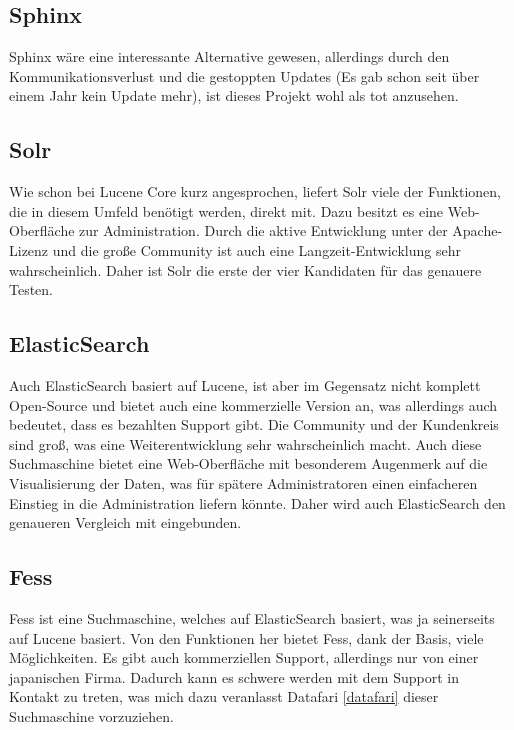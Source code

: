 \subsection{Sphinx}

Sphinx wäre eine interessante Alternative gewesen, allerdings durch den Kommunikationsverlust und die gestoppten Updates (Es gab schon seit über einem Jahr kein Update mehr), ist dieses Projekt wohl als tot anzusehen. \cite{SphinxTechnologiesInc.2019}

\subsection{Solr}

Wie schon bei Lucene Core kurz angesprochen, liefert Solr viele der Funktionen, die in diesem Umfeld benötigt werden, direkt mit. Dazu besitzt es eine Web-Oberfläche zur Administration. Durch die aktive Entwicklung unter der Apache-Lizenz und die große Community ist auch eine Langzeit-Entwicklung sehr wahrscheinlich. Daher ist Solr die erste der vier Kandidaten für das genauere Testen. \cite{TheApacheSoftwareFoundation.2019}

\subsection{ElasticSearch}

Auch ElasticSearch basiert auf Lucene, ist aber im Gegensatz nicht komplett Open-Source und bietet auch eine kommerzielle Version an, was allerdings auch bedeutet, dass es bezahlten Support gibt. Die Community und der Kundenkreis sind groß, was eine Weiterentwicklung sehr wahrscheinlich macht. Auch diese Suchmaschine bietet eine Web-Oberfläche mit besonderem Augenmerk auf die Visualisierung der Daten, was für spätere Administratoren einen einfacheren Einstieg in die Administration liefern könnte. Daher wird auch ElasticSearch den genaueren Vergleich mit eingebunden. \cite{Elasticsearch.2019}

\subsection{Fess}

Fess ist eine Suchmaschine, welches auf ElasticSearch basiert, was ja seinerseits auf Lucene basiert. Von den Funktionen her bietet Fess, dank der Basis, viele Möglichkeiten. Es gibt auch kommerziellen Support, allerdings nur von einer japanischen Firma. Dadurch kann es schwere werden mit dem Support in Kontakt zu treten, was mich dazu veranlasst Datafari \ref{datafari} dieser Suchmaschine vorzuziehen. \cite{CodeLibs.2019}

